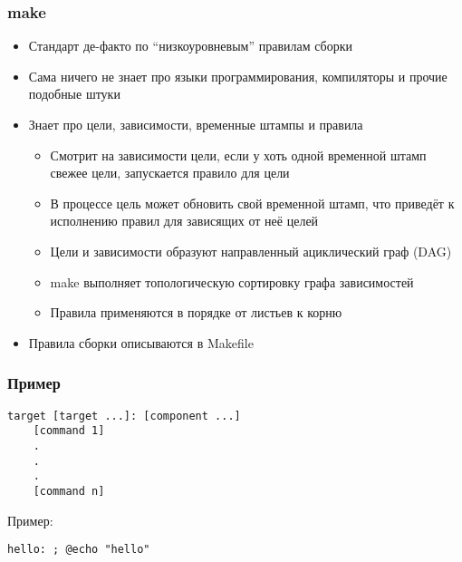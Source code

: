 \documentclass{../../slides-style}
\begin{document}
    \begin{frame}
        \frametitle{make}
        \begin{itemize}
            \item Стандарт де-факто по ``низкоуровневым'' правилам сборки
            \item Сама ничего не знает про языки программирования, компиляторы и прочие подобные штуки
            \item Знает про цели, зависимости, временные штампы и правила
            \begin{itemize}
                \item Смотрит на зависимости цели, если у хоть одной временной штамп свежее цели, запускается правило для цели
                \item В процессе цель может обновить свой временной штамп, что приведёт к исполнению правил для зависящих от неё целей
                \item Цели и зависимости образуют направленный ациклический граф (DAG)
                \item make выполняет топологическую сортировку графа зависимостей
                \item Правила применяются в порядке от листьев к корню
            \end{itemize}
            \item Правила сборки описываются в Makefile
        \end{itemize}
    \end{frame}

    \begin{frame}[fragile]
        \frametitle{Пример}
        \begin{footnotesize}
            \begin{verbatim}
target [target ...]: [component ...]
    [command 1]
    .
    .
    .
    [command n]
            \end{verbatim}
        \end{footnotesize}
        Пример:
        \begin{footnotesize}
            \begin{verbatim}
hello: ; @echo "hello"
            \end{verbatim}
        \end{footnotesize}
    \end{frame}
\end{document}
